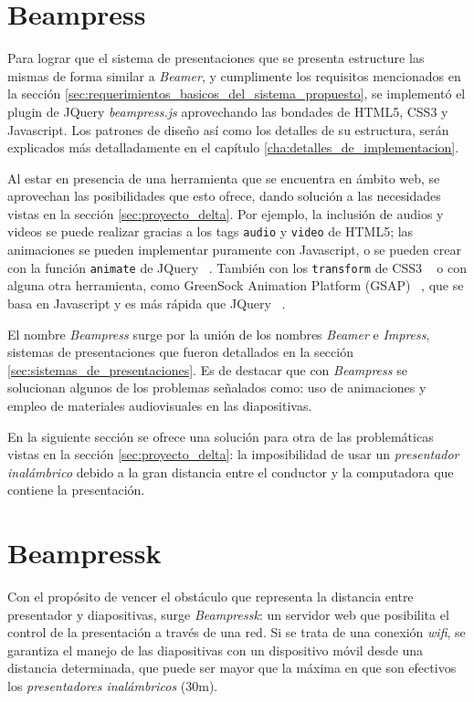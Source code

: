 	\section{Beampress} %
	\label{sec:beampress}
		Para lograr que el sistema de presentaciones que se presenta estructure las mismas de forma similar a \textit{Beamer}, y cumplimente los requisitos mencionados en la sección \ref{sec:requerimientos_basicos_del_sistema_propuesto}, se implementó el plugin de JQuery \textit{beampress.js} aprovechando las bondades de HTML5, CSS3 y Javascript. Los patrones de diseño así como los detalles de su estructura, serán explicados más detalladamente en el capítulo \ref{cha:detalles_de_implementacion}.


		Al estar en presencia de una herramienta que se encuentra en ámbito web, se aprovechan las posibilidades que esto ofrece, dando solución a las necesidades vistas en la sección \ref{sec:proyecto_delta}. Por ejemplo, la inclusión de audios y videos se puede realizar gracias a los tags \texttt{audio} y \texttt{video} de HTML5; las animaciones se pueden implementar puramente con Javascript, o se pueden crear con la función \texttt{animate} de JQuery ~\cite{animate}. También con los \texttt{transform} de CSS3 ~\cite{csstransform} o con alguna otra herramienta, como GreenSock Animation Platform (GSAP) ~\cite{gsap}, que se basa en Javascript y es más rápida que JQuery ~\cite{jquery}. 


		El nombre \textit{Beampress} surge por la unión de los nombres \textit{Beamer} e \textit{Impress}, sistemas de presentaciones que fueron detallados en la sección \ref{sec:sistemas_de_presentaciones}. Es de destacar que con \textit{Beampress} se solucionan algunos de los problemas señalados como: uso de animaciones y empleo de materiales audiovisuales en las diapositivas.	

	En la siguiente sección se ofrece una solución para otra de las problemáticas vistas en la sección \ref{sec:proyecto_delta}: la imposibilidad de usar un \textit{presentador inalámbrico} debido a la gran distancia entre el conductor y la computadora que contiene la presentación.
	
	\section{Beampressk} %
	\label{sec:beampressk}
		Con el propósito de vencer el obstáculo que representa la distancia entre presentador y diapositivas, surge \textit{Beampressk}: un servidor web que posibilita el control de la presentación a través de una red. Si se trata de una conexión \textit{wifi}, se garantiza el manejo de las diapositivas con un dispositivo móvil desde una distancia determinada, que puede ser mayor que la máxima en que son efectivos los \textit{presentadores inalámbricos} (30m).

